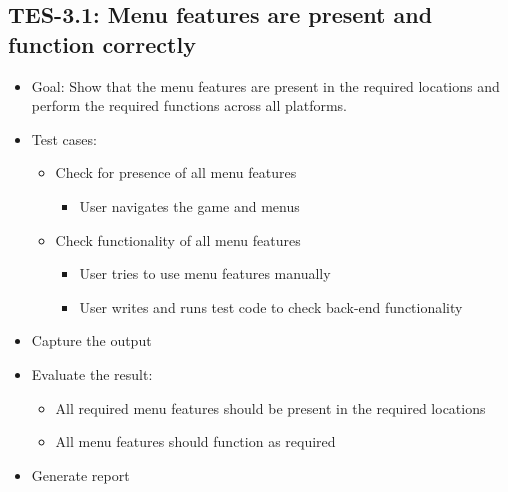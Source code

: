 \subsection{TES-3.1: Menu features are present and function correctly }
\begin{itemize}
\item Goal: Show that the menu features are present in the required locations
and perform the required functions across all platforms. 
\item Test cases: 

\begin{itemize}
\item Check for presence of all menu features 

\begin{itemize}
\item User navigates the game and menus 
\end{itemize}
\item Check functionality of all menu features 

\begin{itemize}
\item User tries to use menu features manually 
\item User writes and runs test code to check back-end functionality 
\end{itemize}
\end{itemize}
\item Capture the output 
\item Evaluate the result: 

\begin{itemize}
\item All required menu features should be present in the required locations 
\item All menu features should function as required 
\end{itemize}
\item Generate report
\end{itemize}

